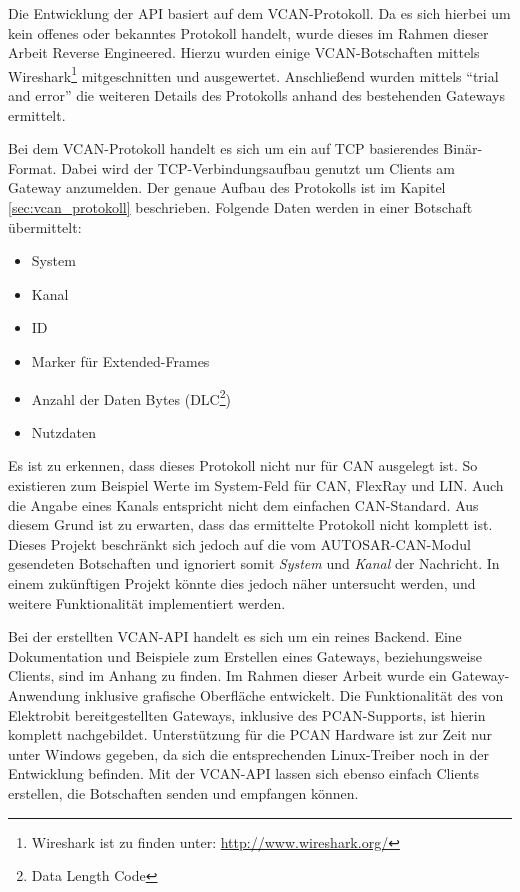 \documentclass[
  a4paper,					    %
  twoside,
  DIV=calc,     				%
  bibliography=totoc,
  cleardoublepage=empty,
  ngerman,     					%
  final       					%
]{scrbook}
\begin{document}
Die Entwicklung der API basiert auf dem VCAN-Protokoll. Da es sich hierbei um kein offenes oder bekanntes Protokoll handelt, wurde dieses im Rahmen dieser Arbeit Reverse Engineered. Hierzu wurden einige VCAN-Botschaften mittels Wireshark\footnote{Wireshark ist zu finden unter: \url{http://www.wireshark.org/}} mitgeschnitten und ausgewertet. Anschließend wurden mittels "`trial and error"' die weiteren Details des Protokolls anhand des bestehenden Gateways ermittelt.

Bei dem VCAN-Protokoll handelt es sich um ein auf TCP basierendes Binär-Format. Dabei wird der TCP-Verbindungsaufbau genutzt um Clients am Gateway anzumelden. Der genaue Aufbau des Protokolls ist im Kapitel \ref{sec:vcan_protokoll} beschrieben. Folgende Daten werden in einer Botschaft übermittelt:

\begin{itemize}
    \item System
    \item Kanal
    \item ID
    \item Marker für Extended-Frames
    \item Anzahl der Daten Bytes (DLC\footnote{Data Length Code})
    \item Nutzdaten
\end{itemize}

Es ist zu erkennen, dass dieses Protokoll nicht nur für CAN ausgelegt ist. So existieren zum Beispiel Werte im System-Feld für CAN, FlexRay und LIN. Auch die Angabe eines Kanals entspricht nicht dem einfachen CAN-Standard. Aus diesem Grund ist zu erwarten, dass das ermittelte Protokoll nicht komplett ist. Dieses Projekt beschränkt sich jedoch auf die vom AUTOSAR-CAN-Modul gesendeten Botschaften und ignoriert somit \emph{System} und \emph{Kanal} der Nachricht. In einem zukünftigen Projekt könnte dies jedoch näher untersucht werden, und weitere Funktionalität implementiert werden.

Bei der erstellten VCAN-API handelt es sich um ein reines Backend. Eine Dokumentation und Beispiele zum Erstellen eines Gateways, beziehungsweise Clients, sind im Anhang zu finden. Im Rahmen dieser Arbeit wurde ein Gateway-Anwendung inklusive grafische Oberfläche entwickelt. Die Funktionalität des von Elektrobit bereitgestellten Gateways, inklusive des PCAN-Supports, ist hierin komplett nachgebildet. Unterstützung für die PCAN Hardware ist zur Zeit nur unter Windows gegeben, da sich die entsprechenden Linux-Treiber noch in der Entwicklung befinden. Mit der VCAN-API lassen sich ebenso einfach Clients erstellen, die Botschaften senden und empfangen können.
\end{document}
